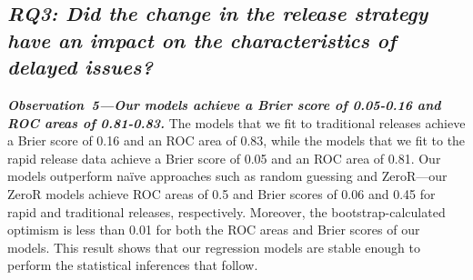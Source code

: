 \subsection*{\textit{\textbf{RQ3: Did the change in the release strategy have an impact on
the characteristics of delayed issues?}}}

\begin{sloppypar}
\noindent\textit{\textbf{Observation~5---Our models achieve a Brier score of 0.05-0.16 and ROC
areas of 0.81-0.83.}}
The models that we fit to traditional releases achieve a Brier score of 0.16 and
an ROC area of 0.83, while the models that we fit to the rapid release data
achieve a Brier score of 0.05 and an ROC area of 0.81. Our models outperform
na\"{i}ve approaches such as random guessing and ZeroR---our ZeroR models
achieve ROC areas of 0.5 and Brier scores of 0.06 and 0.45 for rapid and
traditional releases, respectively. Moreover, the bootstrap-calculated optimism
is less than 0.01 for both the ROC areas and Brier scores of our models. This
result shows that our regression models are stable enough to perform the
statistical inferences that follow.\\


\end{sloppypar}
